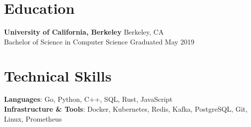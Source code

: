 \documentclass[letterpaper,10pt]{article}
\begin{document}
\section{Education}
\textbf{University of California, Berkeley} \hfill Berkeley, CA \\
Bachelor of Science in Computer Science \hfill Graduated May 2019

\section{Technical Skills}
\textbf{Languages}: Go, Python, C++, SQL, Rust, JavaScript \\
\textbf{Infrastructure \& Tools}: Docker, Kubernetes, Redis, Kafka, PostgreSQL, Git, Linux, Prometheus
\end{document}
